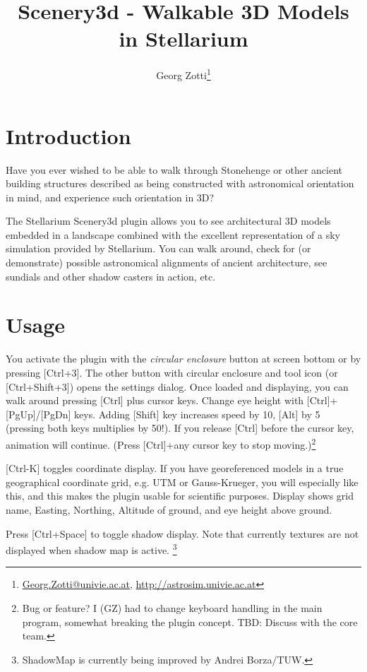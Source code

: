 \documentclass[a4paper]{article}
\title{Scenery3d - Walkable 3D Models in Stellarium}
\author{Georg Zotti\thanks{\url{Georg.Zotti@univie.ac.at}, \url{http://astrosim.univie.ac.at}}}
\begin{document}
\maketitle

\section{Introduction}
\label{sec:Introduction}


Have you ever wished to be able to walk through Stonehenge or other
ancient building structures described as being constructed with astronomical
orientation in mind, and experience such orientation in 3D?

The Stellarium Scenery3d plugin
allows you to see architectural 3D models
embedded in a landscape combined with the excellent representation of
a sky simulation provided by Stellarium. You can walk around, check
for (or demonstrate) possible astronomical alignments of ancient
architecture, see sundials and other shadow casters in action, etc.

\section{Usage}
\label{sec:Usage}


You activate the plugin with the \emph{circular enclosure} button at screen
bottom or by pressing [Ctrl+3]. The other button with circular
enclosure and tool icon (or [Ctrl+Shift+3]) opens the settings
dialog. Once loaded and displaying, you can walk around pressing
[Ctrl] plus cursor keys. Change eye height with [Ctrl]+[PgUp]/[PgDn]
keys. Adding [Shift] key increases speed by 10, [Alt] by 5 (pressing
both keys multiplies by 50!). If you release [Ctrl] before the cursor
key, animation will continue. (Press [Ctrl]+any cursor key to stop
moving.)\footnote{Bug or feature? I (GZ) had to change keyboard
  handling in the main program, somewhat breaking the plugin
  concept. TBD: Discuss with the core team.}

[Ctrl-K] toggles coordinate display. If you have georeferenced models
in a true geographical coordinate grid, e.g. UTM or Gauss-Krueger, you
will especially like this, and this makes the plugin usable for
scientific purposes. Display shows grid name, Easting, Northing,
Altitude of ground, and eye height above ground.

Press [Ctrl+Space] to toggle shadow display. Note that currently
textures are not displayed when shadow map is active. \footnote{ShadowMap is currently being improved by Andrei Borza/TUW.}
\end{document}
